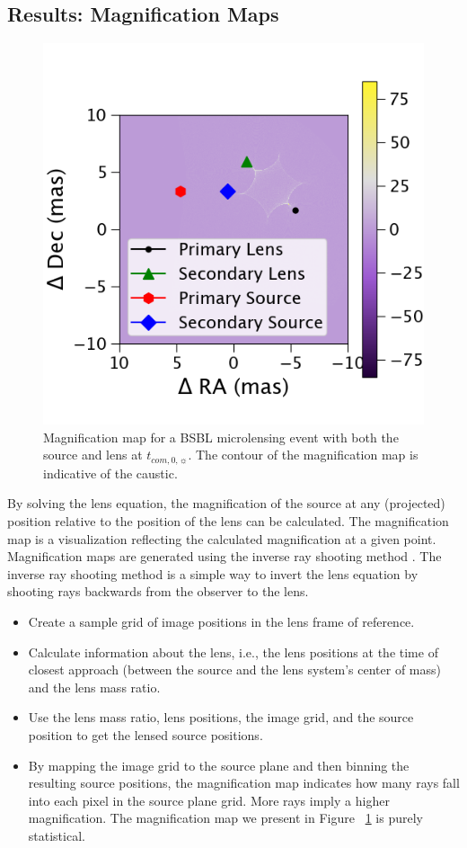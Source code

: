 \documentclass[twocolumn]{aastex701}
\newcommand{\tcomnot}{t_{com,0,\sun}}
\begin{document}
\subsection{Results: Magnification Maps}

\begin{figure}
    \centering
    \includegraphics[width= 0.48 \textwidth]{figures/magmap.png}
    \caption{Magnification map for a BSBL microlensing event with both the source and lens at $\tcomnot$. The contour of the magnification map is indicative of the caustic. }
    \label{fig:magmaps}
\end{figure}


\label{sec:results_magmap}

By solving the lens equation, the magnification of the source at any (projected) position relative to the position of the lens can be calculated. The magnification map is a visualization reflecting the calculated magnification at a given point. Magnification maps are generated using the inverse ray shooting method \citep{Bennett_2010}. The inverse ray shooting method is a simple way to invert the lens equation by shooting
rays backwards from the observer to the lens.

\begin{itemize}
    \item Create a sample grid of image positions in the lens frame of reference. 
    \item Calculate information about the lens, i.e., the lens positions at the time of closest approach (between the source and the lens system’s center of mass) and the lens mass ratio.
    \item Use the lens mass ratio, lens positions, the image grid, and the source position to get the lensed source positions. 
    \item By mapping the image grid to the source plane and then binning the resulting source positions, the magnification map indicates how many rays fall into each pixel in the source plane grid. More rays imply a higher magnification. The magnification map we present in Figure ~\ref{fig:magmaps} is purely statistical. 
\end{itemize}
\end{document}
